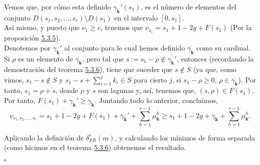 \documentclass[11pt,spanish]{book}
\newcommand{\qed}{\begin{flushright} $\square$ \end{flushright}}
\newcommand{\fr}{\delta_{FR}^{r}(m)}
\begin{document}
Vemos que, por cómo esta definido $\gamma_{\mathbf{k}}'(s_1)$, es el número de elementos del conjunto $D(s_1,s_2,\ldots,s_r)\setminus D(s_1)$ en el intervalo $[0,s_1]$.\\
Así mismo, y puesto que $\nu_1\geq c$, tenemos que $\nu_{s_1}=s_1+1-2g+F(s_1)$ (Por la proposición \hyperlink{prop5.4.6}{5.3.5}). \\

Denotemos por $\overline{\gamma_{\mathbf{k}}'}$ al conjunto para le cual hemos definido $\overline{\gamma_{\mathbf{k}}}$ como su cardinal. Si $\rho$ es un elemento de $\overline{\gamma_{\mathbf{k}}}$, pero tal que $s:=s_1-\rho \notin\overline{\gamma_{\mathbf{k}}'}$, entonces (recordando la demostración del teorema \hyperlink{prop5.4.7}{5.3.6}), tiene que suceder que $s\notin S$ (ya que, como vimos, $s_1-s\notin S$ y $s_1-s+\sum_{i=1}^{j}k_i\in S$ para cierto $j$, si $s_1-\rho\geq 0$, $\rho\in \overline{\gamma_{\mathbf{k}}}$). Por tanto, $s_1=\rho+s$, donde $\rho$ y $s$ son lagunas y, así, tenemos que, $(s,\rho)\in F(s_1)$. Por tanto, $F(s_1)+\gamma_{\mathbf{k}}'\geq \gamma_{\mathbf{k}}$. Juntando todo lo anterior, concluimos,
$$\nu_{s_1,s_2,\ldots,s_r}=s_1+1-2g+F(s_1)+\gamma_{\mathbf{k}}'+\sum_{h=1}^{r-1}\mu_{\mathbf{k}}^{h}\geq s_1+1-2g+\gamma_{\mathbf{k}}+\sum_{h=1}^{r-1}\mu_{\mathbf{k}}^{h}.$$

Aplicando la definición de $\fr$, y calculando los mínimos de forma separada (como hicimos en el teorema \hyperlink{prop5.4.7}{5.3.6}) obtenemos el resultado.
\qed
\end{document}
